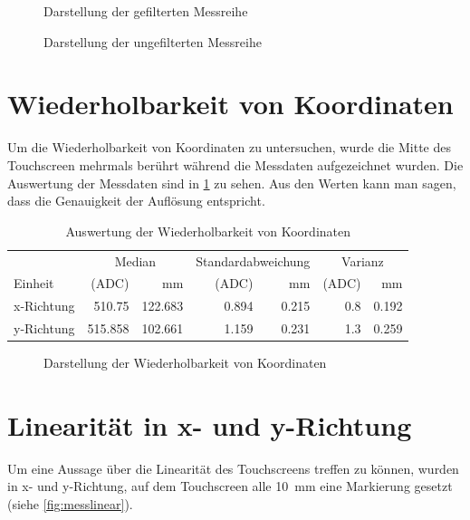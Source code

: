 \begin{figure}[ht!]
    \centering
    
    \caption{Darstellung der gefilterten Messreihe}
    \label{fig:filtered}
    \centering
    
    \caption{Darstellung der ungefilterten Messreihe}
    \label{fig:unfiltered}
\end{figure}

\newpage

\section{Wiederholbarkeit von Koordinaten}
\label{ab:wiederholung}
Um die Wiederholbarkeit von Koordinaten zu untersuchen, wurde die Mitte des Touchscreen mehrmals berührt während die Messdaten aufgezeichnet wurden.
Die Auswertung der Messdaten sind in \cref{tab:wiederholung} zu sehen.
Aus den Werten kann man sagen, dass die Genauigkeit der Auflösung entspricht.
\begin{table}[ht!]
    \caption{Auswertung der Wiederholbarkeit von Koordinaten}
    \begin{center}
        \begin{tabular}{@{}lrrrrrr@{} }
            \toprule&\multicolumn{2}{c}{Median}& \multicolumn{2}{c}{Standardabweichung}&\multicolumn{2}{c}{Varianz} \\ 
            Einheit    &(ADC)              &mm             &(ADC)          &mm             &(ADC)      &mm\\\midrule
         x-Richtung & \SI{510,75}{}    & \SI{122,683}{}&\SI{0,894}{}   &\SI{0,215}{}   &\SI{0,8}{}     & \SI{0,192}{} \\  
         y-Richtung & \SI{515,858}{}    & \SI{102,661}{}&\SI{1,159}{}   &\SI{0,231}{}   &\SI{1,3}{}     & \SI{0,259}{} \\ \bottomrule 
        \end{tabular}
        \label{tab:wiederholung}
    \end{center}   
\end{table}


\begin{figure}[ht!]
    \centering
    
    \caption{Darstellung der Wiederholbarkeit von Koordinaten}
    \label{fig:wiederholung}
\end{figure}

\section{Linearität in x- und y-Richtung}
\label{ab:linear}
Um eine Aussage über die Linearität des Touchscreens treffen zu können, wurden in x- und y-Richtung, auf dem Touchscreen alle \SI{10}{mm} eine Markierung gesetzt (siehe \cref{fig:messlinear}).

